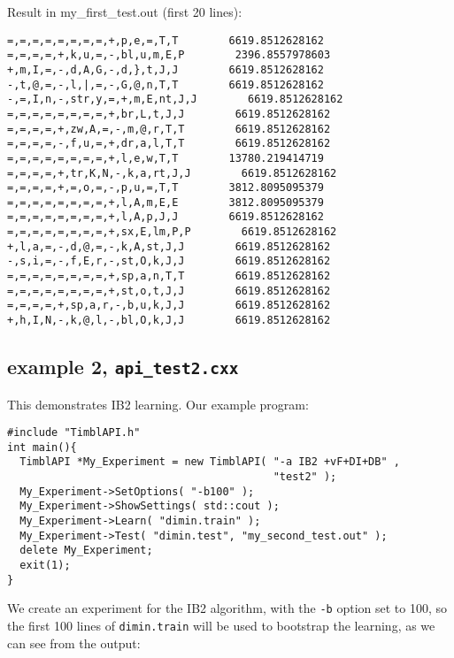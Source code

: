 \documentclass{report}
\begin{document}
Result in my\_first\_test.out (first 20 lines):
\begin{footnotesize}
\begin{verbatim}
=,=,=,=,=,=,=,=,+,p,e,=,T,T        6619.8512628162
=,=,=,=,+,k,u,=,-,bl,u,m,E,P        2396.8557978603
+,m,I,=,-,d,A,G,-,d,},t,J,J        6619.8512628162
-,t,@,=,-,l,|,=,-,G,@,n,T,T        6619.8512628162
-,=,I,n,-,str,y,=,+,m,E,nt,J,J        6619.8512628162
=,=,=,=,=,=,=,=,+,br,L,t,J,J        6619.8512628162
=,=,=,=,+,zw,A,=,-,m,@,r,T,T        6619.8512628162
=,=,=,=,-,f,u,=,+,dr,a,l,T,T        6619.8512628162
=,=,=,=,=,=,=,=,+,l,e,w,T,T        13780.219414719
=,=,=,=,+,tr,K,N,-,k,a,rt,J,J        6619.8512628162
=,=,=,=,+,=,o,=,-,p,u,=,T,T        3812.8095095379
=,=,=,=,=,=,=,=,+,l,A,m,E,E        3812.8095095379
=,=,=,=,=,=,=,=,+,l,A,p,J,J        6619.8512628162
=,=,=,=,=,=,=,=,+,sx,E,lm,P,P        6619.8512628162
+,l,a,=,-,d,@,=,-,k,A,st,J,J        6619.8512628162
-,s,i,=,-,f,E,r,-,st,O,k,J,J        6619.8512628162
=,=,=,=,=,=,=,=,+,sp,a,n,T,T        6619.8512628162
=,=,=,=,=,=,=,=,+,st,o,t,J,J        6619.8512628162
=,=,=,=,+,sp,a,r,-,b,u,k,J,J        6619.8512628162
+,h,I,N,-,k,@,l,-,bl,O,k,J,J        6619.8512628162
\end{verbatim}
\end{footnotesize}
\clearpage

\subsection{example 2, {\tt api\_test2.cxx}}

This demonstrates IB2 learning. Our example program:

\begin{footnotesize}
\begin{verbatim}
#include "TimblAPI.h"
int main(){
  TimblAPI *My_Experiment = new TimblAPI( "-a IB2 +vF+DI+DB" , 
                                          "test2" );
  My_Experiment->SetOptions( "-b100" );
  My_Experiment->ShowSettings( std::cout );
  My_Experiment->Learn( "dimin.train" );  
  My_Experiment->Test( "dimin.test", "my_second_test.out" );
  delete My_Experiment;
  exit(1);
}
\end{verbatim}
\end{footnotesize}

We create an experiment for the IB2 algorithm, with the {\tt -b} option set
to 100, so the first 100 lines of {\tt dimin.train} will be used to
bootstrap the learning, as we can see from the output:
\end{document}

